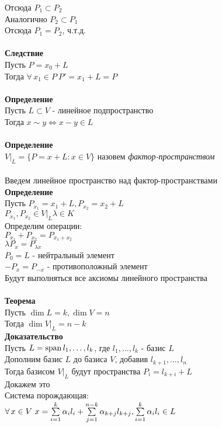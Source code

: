 \documentclass[12pt]{article}
\begin{document}
Отсюда $P_1 \subset P_2$\\
Аналогично $P_2 \subset P_1$\\
Отсюда $P_1 = P_2$, ч.т.д.\\\\
\textbf{Следствие}\\
Пусть $P =x_0 + L$\\
Тогда $\forall\,x_1 \in P\ P'=x_1+L = P$\\\\
\textbf{Определение}\\
Пусть $L \subset V$ - линейное подпространство\\
Тогда $x\sim y \Leftrightarrow x-y \in L$\\\\
\textbf{Определение}\\
$V|_L = \{P=x+L : x\in V\}$ назовем \textit{фактор-пространством}\\\\
Введем линейное пространство над фактор-пространствами\\
\textbf{Определение}\\
Пусть $P_{x_1} = x_1+L, P_{x_2}=x_2+L$\\
$P_{x_1},P_{x_2} \in V|_L \lambda \in K$\\
Определим операции:\\
$P_{x_1} + P_{x_2} = P_{x_1+x_2}$\\
$\lambda P_x = P_{\lambda x}$\\
$P_0 = L$ - нейтральный элемент\\
$-P_x = P_{-x}$ - противоположный элемент\\
Будут выполняться все аксиомы линейного пространства\\\\
\textbf{Теорема}\\
Пусть $\dim L = k, \dim V = n$\\
Тогда $\dim V|_L = n-k$\\
\textbf{Доказательство}\\
Пусть $L = \operatorname{span} l_1,\ldots,l_k$, где $l_1,\ldots,l_k$ - базис $L$\\
Дополним базис $L$ до базиса $V$, добавив $l_{k+1},\ldots,l_n$\\
Тогда базисом $V|_L$ будут пространства $P_i = l_{k+i} + L$\\
Докажем это\\
Система порождающая:\\
$\forall\,x \in V\ x=\sum\limits_{i=1}^k \alpha_il_i + \sum\limits_{j=1}^{n-k} \alpha_{k+j}l_{k+j}, \sum\limits_{i=1}^k \alpha_il_i \in L$\\
\end{document}

